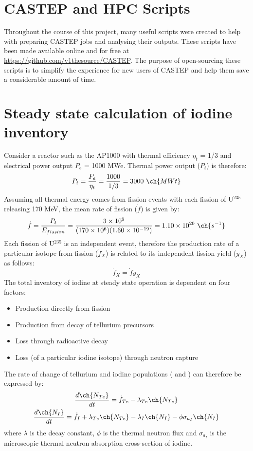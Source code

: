 \documentclass[a4paper,12pt,twoside]{report}
\begin{document}
\chapter{CASTEP and HPC Scripts}
\label{castep_scripts}

Throughout the course of this project, many useful scripts were created to help with preparing CASTEP jobs and analysing their outputs. These scripts have been made available online and for free at \href{https://github.com/v1thesource/CASTEP}{https://github.com/v1thesource/CASTEP}. The purpose of open-sourcing these scripts is to simplify the experience for new users of CASTEP and help them save a considerable amount of time.

\chapter{Steady state calculation of iodine inventory}

Consider a reactor such as the AP1000 with thermal efficiency $\eta_{t}$ = 1/3 and electrical power output $P_{e}$ = 1000 MWe. Thermal power output ($P_{t}$) is therefore:
\begin{equation}
P_{t} = \frac{P_{e}}{\eta_{t}} = \frac{1000}{1/3} = 3000 \ \ch{MWt}
\end{equation}
Assuming all thermal energy comes from fission events with each fission of U$^{235}$ releasing 170 MeV, the mean rate of fission ($\dot{f}$) is given by:
\begin{equation}
\dot{f} = \frac{P_{t}}{E_{fission}} = \frac{3 \times 10^{9}}{(170 \times 10^{6})(1.60 \times 10^{-19})} = 1.10 \times 10^{20} \ \ch{s^{-1}}
\end{equation}
Each fission of U$^{235}$ is an independent event, therefore the production rate of a particular isotope from fission ($\dot{f}_{X}$) is related to its independent fission yield ($y_{X}$) as follows:
\begin{equation}
\dot{f}_{X} = \dot{f}y_{X}
\end{equation}
The total inventory of iodine at steady state operation is dependent on four factors:
\begin{itemize}
\item Production directly from fission
\item Production from decay of tellurium precursors
\item Loss through radioactive decay
\item Loss (of a particular iodine isotope) through neutron capture
\end{itemize}
The rate of change of tellurium and iodine populations ( and ) can therefore be expressed by:
\begin{gather}
\frac{d\ch{N_{Te}}}{dt} = \dot{f}_{Te} - \lambda_{Te}\ch{N_{Te}} \\
\frac{d\ch{N_{I}}}{dt} = \dot{f}_{I} + \lambda_{Te}\ch{N_{Te}} - \lambda_{I}\ch{N_{I}} - \phi\sigma_{a_{I}}\ch{N_{I}}
\end{gather}
where $\lambda$ is the decay constant, $\phi$ is the thermal neutron flux and $\sigma_{a_{I}}$ is the microscopic thermal neutron absorption cross-section of iodine.
\end{document}
